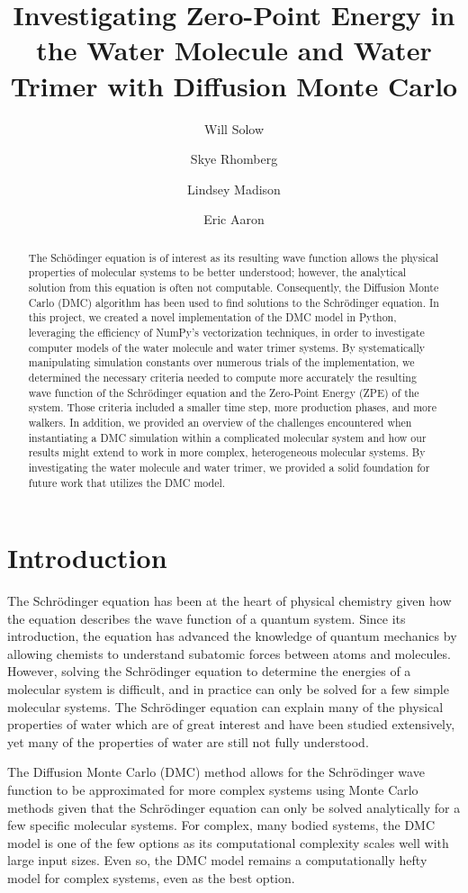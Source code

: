 \documentclass[journal=jacsat,manuscript=article]{achemso}
\author{Will Solow}
\author{Skye Rhomberg}
\author{Lindsey Madison}
\author{Eric Aaron}
\affiliation[Colby College]
{Department of Computer Science, Colby College, Waterville, ME}
\title{Investigating Zero-Point Energy in the Water Molecule and Water Trimer with Diffusion Monte Carlo}
\begin{document}
\begin{abstract}
The Sch\"odinger equation is of interest as its resulting wave function allows the physical properties of molecular systems to be better understood; however, the analytical solution from this equation is often not computable. Consequently, the Diffusion Monte Carlo (DMC) algorithm has been used to find solutions to the Schr\"odinger equation.  In this project, we created a novel implementation of the DMC model in Python, leveraging the efficiency of NumPy’s vectorization techniques, in order to investigate computer models of the water molecule and water trimer systems. By systematically manipulating simulation constants over numerous trials of the implementation, we determined the necessary criteria needed to compute more accurately the resulting wave function of the Schr\"odinger equation and the Zero-Point Energy (ZPE) of the system. Those criteria included a smaller time step, more production phases, and more walkers. In addition, we provided an overview of the challenges encountered when instantiating a DMC simulation within a complicated molecular system and how our results might extend to work in more complex, heterogeneous molecular systems. By investigating the water molecule and water trimer, we provided a solid foundation for future work that utilizes the DMC model.
\end{abstract}


\section{Introduction}

The Schr\"odinger equation has been at the heart of physical chemistry given how the equation describes the wave function of a quantum system. Since its introduction, the equation has advanced the knowledge of quantum mechanics by allowing chemists to understand subatomic forces between atoms and molecules. However, solving the Schr\"odinger equation to determine the energies of a molecular system is difficult, and in practice can only be solved for a few simple molecular systems. The Schr\"odinger equation can explain many of the physical properties of water which are of great interest and have been studied extensively\cite{Goldman2004,Gillan2013}, yet many of the properties of water are still not fully understood.\cite{Liu1996}

The Diffusion Monte Carlo\cite{Anderson1975} (DMC) method allows for the Schr\"odinger wave function to be approximated for more complex systems using Monte Carlo methods given that the Schr\"odinger equation can only be solved analytically for a few specific molecular systems.\cite{Faber1996,Pang2014} For complex, many bodied systems\cite{Lee2019,Veil2001}, the DMC model is one of the few options as its computational complexity scales well with large input sizes. Even so, the DMC model remains a computationally hefty model for complex systems, even as the best option. 
	
\end{document}
